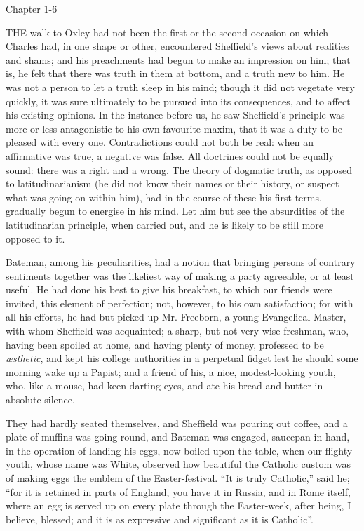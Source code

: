 Chapter 1-6


THE walk to Oxley had not been the first
or the second occasion on which Charles had, in one shape or other,
encountered Sheffield's views about realities and shams; and his
preachments had begun to make an impression on him; that is, he felt
that there was truth in them at bottom, and a truth new to him. He was
not a person to let a truth sleep in his mind; though it did not
vegetate very quickly, it was sure ultimately to be pursued into its
consequences, and to affect his existing opinions. In the instance
before us, he saw Sheffield's principle was more or less antagonistic
to his own favourite maxim, that it was a duty to be pleased with
every one. Contradictions could not both be real: when an affirmative
was true, a negative was false. All doctrines could not be equally
sound: there was a right and a wrong. The theory of dogmatic truth, as
opposed to latitudinarianism (he did not know their names or their
history, or suspect what was going on within him), had in the course
of these his first terms, gradually begun to energise in his mind. Let
him but see the absurdities of the latitudinarian principle, when
carried out, and he is likely to be still more opposed to it.

Bateman, among his peculiarities, had a notion that bringing
persons of contrary sentiments together was the likeliest way of
making a party agreeable, or at least useful. He had done his best to
give his breakfast, to which our friends were invited, this element of
perfection; not, however, to his own satisfaction; for with all his
efforts, he had but picked up Mr. Freeborn, a young Evangelical
Master, with whom Sheffield was acquainted; a sharp, but not very wise
freshman, who, having been spoiled at home, and having plenty of
money, professed to be \emph{æsthetic}, and kept his college
authorities in a perpetual fidget lest he should some morning wake up
a Papist; and a friend of his, a nice, modest-looking youth, who, like
a mouse, had keen darting eyes, and ate his bread and butter in
absolute silence.

They had hardly seated themselves, and Sheffield was pouring out
coffee, and a plate of muffins was going round, and Bateman was
engaged, saucepan in hand, in the operation of landing his eggs, now
boiled upon the table, when our flighty youth, whose name was White,
observed how beautiful the Catholic custom was of making eggs the
emblem of the Easter-festival. ``It is truly Catholic,'' said
he; ``for it is retained in parts of England, you have it in
Russia, and in Rome itself, where an egg is served up on every plate
through the Easter-week, after being, I believe, blessed; and it is as
expressive and significant as it is Catholic''.

